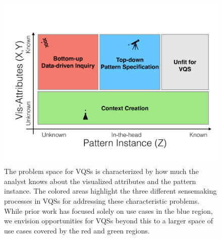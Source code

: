 \begin{figure}[h!]
  \centering
  \includegraphics[width=\linewidth]{figures/2dmodel.pdf}
  \caption{The problem space for VQSs is characterized by how much the analyst knows about the visualized attributes and the pattern instance. The colored areas highlight the three different sensemaking processes in VQSs for addressing these characteristic problems. While prior work has focused solely on use cases in the blue region, we envision opportunities for VQSs beyond this to a larger space of use cases covered by the red and green regions.}
  \label{2dmodel}
\end{figure}

